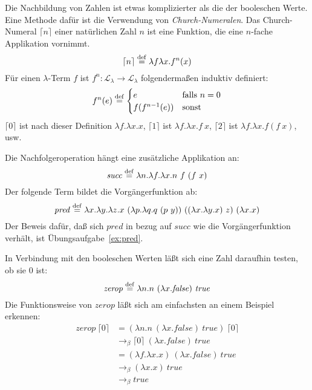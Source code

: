 Die Nachbildung von Zahlen ist etwas komplizierter als die der
booleschen Werte.  Eine Methode dafür ist
die Verwendung von \textit{Church-Numeralen}.  Das
Church-Numeral $\lceil n\rceil$ einer natürlichen Zahl
$n$ ist eine Funktion, die eine $n$-fache Applikation vornimmt.
%
\begin{displaymath}
  \lceil n\rceil \stackrel{\rm def}{=}{} \lambda f\lambda x.f^n(x)
\end{displaymath}
Für einen $\lambda$-Term $f$ ist $f^n : \mathcal{L}_{\lambda}\rightarrow\mathcal{L}_{\lambda}$ folgendermaßen induktiv definiert:
%
\begin{displaymath}
  f^n(e) \stackrel{\rm def}{=}
  \begin{cases}
    e & \text{falls } n = 0\\
    f(f^{n-1}(e)) & \text{sonst}
  \end{cases}
\end{displaymath}
%
$\lceil 0\rceil$ ist nach dieser Definition
$\lambda f.\lambda x.x$, $\lceil 1\rceil$ ist $\lambda f.\lambda x.f~x$,
$\lceil 2\rceil$ ist $\lambda f.\lambda x.f(f~x)$, usw.

Die Nachfolgeroperation hängt eine zusätzliche Applikation an:
%
\begin{displaymath}
  \mathit{succ} \stackrel{\rm def}{=}{} \lambda n.\lambda f.\lambda x.n~f~(f~x)
\end{displaymath}
%
Der folgende Term bildet die Vorgängerfunktion ab:
%
\begin{displaymath}
  \mathit{pred} \stackrel{\rm def}{=}{} \lambda x.\lambda y.\lambda z.x~(\lambda p.\lambda
  q.q~(p~y))~((\lambda x.\lambda y.x)~z)~(\lambda x.x)
\end{displaymath}
%
Der Beweis dafür, daß sich $\mathit{pred}$ in bezug auf $\mathit{succ}$ wie die
Vorgängerfunktion verhält, ist Übungsaufgabe~\ref{ex:pred}.

In Verbindung mit den booleschen Werten läßt sich eine Zahl daraufhin
testen, ob sie $0$ ist:
%
\begin{displaymath}
  \mathit{zerop} \stackrel{\rm def}{=}{} \lambda n.n~(\lambda x.\mathit{false})~\mathit{true}
\end{displaymath}
%
Die Funktionsweise von $\mathit{zerop}$ läßt sich am einfachsten an
einem Beispiel erkennen:
%
\begin{displaymath}
  \begin{split}
    \mathit{zerop}~\lceil 0\rceil & =
    (\lambda n.n~(\lambda x.\mathit{false})~\mathit{true})~\lceil 0\rceil\\
    & \rightarrow_\beta \lceil 0\rceil~(\lambda x.\mathit{false})~\mathit{true}\\
    & = (\lambda f.\lambda x.x)~(\lambda x.\mathit{false})~\mathit{true}\\
    & \rightarrow_\beta (\lambda x.x)~\mathit{true}\\
    & \rightarrow_\beta \mathit{true}
  \end{split}
\end{displaymath}
%

